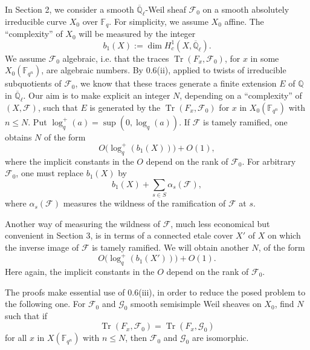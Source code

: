 \documentclass[10pt]{article}
\newcommand{\F}{\mathbb{F}}
\newcommand{\Q}{\mathbb{Q}}
\newcommand{\Ql}{\overline{\mathbb Q}_{\ell}}
\newcommand{\Tr}{\operatorname{Tr}}
\begin{document}
In Section 2, we consider a smooth $\Ql$-Weil sheaf $\mathcal F_0$ on a smooth absolutely irreducible curve $X_0$ over $\F_q$.
For simplicity, we assume $X_0$ affine.
The ``complexity'' of $X_0$ will be measured by the integer
\[
 b_1(X):=\dim H^1_c(X,\Ql).
\]
We assume $\mathcal F_0$ algebraic, i.e. that the traces $\Tr(F_x,\mathcal F_0)$, for $x$ in some $X_0(\F_{q^n})$, are algebraic numbers.
By 0.6(ii), applied to twists of irreducible subquotients of $\mathcal F_0$, we know that these traces generate a finite extension $E$ of $\Q$ in $\Ql$.
Our aim is to make explicit an integer $N$, depending on a ``complexity'' of $(X,\mathcal F)$, such that $E$ is generated by the $\Tr(F_x,\mathcal F_0)$ for $x$ in $X_0(\F_{q^n})$ with $n\le N$.
Put $\log_q^+(a)=\sup(0,\log_q(a))$.
If $\mathcal F$ is tamely ramified, one obtains $N$ of the form
\begin{equation}
O\bigl(\log_q^+(b_1(X))\bigr)+O(1),
\tag{0.9.1}
\end{equation}
where the implicit constants in the $O$ depend on the rank of $\mathcal F_0$.
For arbitrary $\mathcal F_0$, one must replace $b_1(X)$ by
\[
 b_1(X)+\sum_{s\in S}\alpha_s(\mathcal F),
\]
where $\alpha_s(\mathcal F)$ measures the wildness of the ramification of $\mathcal F$ at $s$.

Another way of measuring the wildness of $\mathcal F$, much less economical but convenient in Section 3, is in terms of a connected etale cover $X'$ of $X$ on which the inverse image of $\mathcal F$ is tamely ramified.
We will obtain another $N$, of the form
\begin{equation}
O\bigl(\log_q^+(b_1(X'))\bigr)+O(1).
\tag{0.9.2}
\end{equation}
Here again, the implicit constants in the $O$ depend on the rank of $\mathcal F_0$.

The proofs make essential use of 0.6(iii), in order to reduce the posed problem to the following one.
For $\mathcal F_0$ and $\mathcal G_0$ smooth semisimple Weil sheaves on $X_0$, find $N$ such that if
\[
 \Tr(F_x,\mathcal F_0)=\Tr(F_x,\mathcal G_0)
\]
for all $x$ in $X(\F_{q^n})$ with $n\le N$, then $\mathcal F_0$ and $\mathcal G_0$ are isomorphic.
\end{document}
